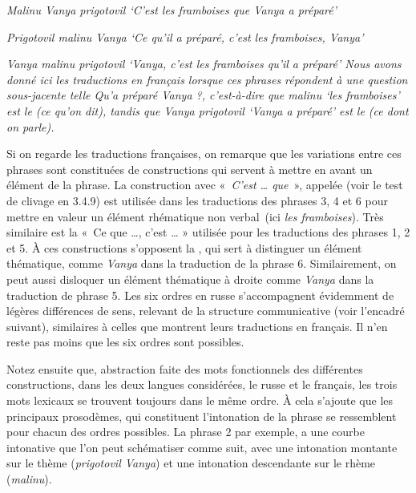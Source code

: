 {    \ex\itshape Malinu Vanya prigotovil
    \glt   ‘C’est les framboises que Vanya a préparé’

    \ex\itshape Prigotovil malinu Vanya
    \glt ‘Ce qu’il a préparé, c’est les framboises, Vanya’

    \ex\itshape Vanya malinu prigotovil
    \glt  ‘Vanya, c’est les framboises qu’il a préparé’
\z
\z
    Nous avons donné ici les traductions en français lorsque ces phrases répondent à une question sous-jacente telle \textit{Qu’a préparé Vanya} ?, c’est-à-dire que \textit{malinu} ‘les framboises’ est le  (ce qu’on dit), tandis que \textit{Vanya prigotovil} ‘Vanya a préparé’ est le  (ce dont on parle).

    Si on regarde les traductions françaises, on remarque que les variations entre ces phrases sont constituées de constructions qui servent à mettre en avant un élément de la phrase. La construction avec «~\textit{C’est … que}~», appelée  (voir le test de clivage en 3.4.9) est utilisée dans les traductions des phrases 3, 4 et 6 pour mettre en valeur un élément rhématique non verbal~(ici \textit{les framboises}). Très similaire est la  «~Ce que …, c’est … » utilisée pour les traductions des phrases 1, 2 et 5. À ces constructions s’opposent la , qui sert à distinguer un élément thématique, comme \textit{Vanya} dans la traduction de la phrase 6. Similairement, on peut aussi disloquer un élément thématique à droite comme \textit{Vanya} dans la traduction de phrase 5. Les six ordres en russe s’accompagnent évidemment de légères différences de sens, relevant de la structure communicative (voir l’encadré suivant), similaires à celles que montrent leurs traductions en français. Il n’en reste pas moins que les six ordres sont possibles.

    Notez ensuite que, abstraction faite des mots fonctionnels des différentes constructions, dans les deux langues considérées, le russe et le français, les trois mots lexicaux se trouvent toujours dans le même ordre. À cela s’ajoute que les principaux prosodèmes, qui constituent l’intonation de la phrase se ressemblent pour chacun des ordres possibles. La phrase 2 par exemple, a une courbe intonative que l’on peut schématiser comme suit, avec une intonation montante sur le thème (\textit{prigotovil Vanya}) et une intonation descendante sur le rhème (\textit{malinu}).

}

